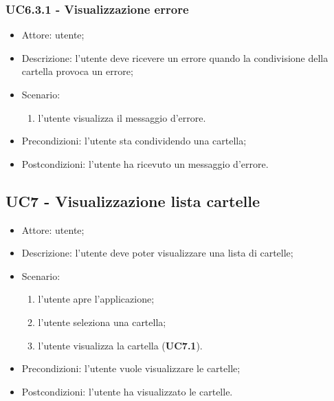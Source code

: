     \subsubsection{UC6.3.1 - Visualizzazione errore }
    \begin{itemize}
        \item Attore: utente;
        \item Descrizione: l'utente deve ricevere un errore quando la condivisione della cartella provoca un errore;
        \item Scenario:
        \begin{enumerate}
        \item l'utente visualizza il messaggio d'errore.
        \end{enumerate}   
        \item Precondizioni: l'utente sta condividendo una cartella;
        \item Postcondizioni: l'utente ha ricevuto un messaggio d'errore.
    \end{itemize}

    \subsection{UC7 - Visualizzazione lista cartelle}
    \begin{itemize}
        \item Attore: utente;
        \item Descrizione: l'utente deve poter visualizzare una lista di cartelle;
        \item Scenario:
            \begin{enumerate}
            \item l'utente apre l'applicazione;
            \item l'utente seleziona una cartella;
            \item l'utente visualizza la cartella (\textbf{UC7.1}).
            \end{enumerate}
        \item Precondizioni: l'utente vuole visualizzare le cartelle;
        \item Postcondizioni: l'utente ha visualizzato le cartelle.
    \end{itemize}
